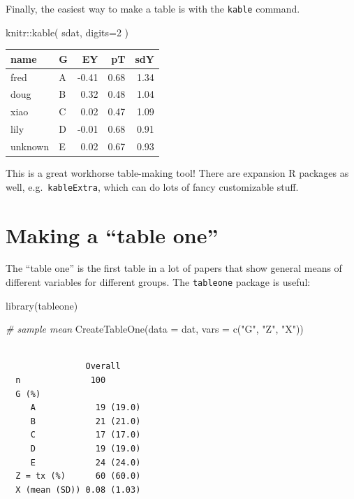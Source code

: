 \documentclass[
  letterpaper,
  DIV=11,
  numbers=noendperiod]{scrreprt}
\newenvironment{Shaded}{\begin{snugshade}}{\end{snugshade}}
\newcommand{\AttributeTok}[1]{\textcolor[rgb]{0.49,0.56,0.16}{#1}}
\newcommand{\CommentTok}[1]{\textcolor[rgb]{0.38,0.63,0.69}{\textit{#1}}}
\newcommand{\DecValTok}[1]{\textcolor[rgb]{0.25,0.63,0.44}{#1}}
\newcommand{\FunctionTok}[1]{\textcolor[rgb]{0.02,0.16,0.49}{#1}}
\newcommand{\NormalTok}[1]{\textcolor[rgb]{0.00,0.44,0.13}{#1}}
\newcommand{\SpecialCharTok}[1]{\textcolor[rgb]{0.25,0.44,0.63}{#1}}
\newcommand{\StringTok}[1]{\textcolor[rgb]{0.25,0.44,0.63}{#1}}
\begin{document}
Finally, the easiest way to make a table is with the \texttt{kable}
command.

\begin{Shaded}
\begin{Highlighting}[]
\NormalTok{knitr}\SpecialCharTok{::}\FunctionTok{kable}\NormalTok{( sdat, }\AttributeTok{digits=}\DecValTok{2}\NormalTok{ )}
\end{Highlighting}
\end{Shaded}

\begin{longtable}[]{@{}llrrr@{}}
\toprule\noalign{}
name & G & EY & pT & sdY \\
\midrule\noalign{}
\endhead
\bottomrule\noalign{}
\endlastfoot
fred & A & -0.41 & 0.68 & 1.34 \\
doug & B & 0.32 & 0.48 & 1.04 \\
xiao & C & 0.02 & 0.47 & 1.09 \\
lily & D & -0.01 & 0.68 & 0.91 \\
unknown & E & 0.02 & 0.67 & 0.93 \\
\end{longtable}

This is a great workhorse table-making tool! There are expansion R
packages as well, e.g.~\texttt{kableExtra}, which can do lots of fancy
customizable stuff.

\hypertarget{making-a-table-one}{%
\section{Making a ``table one''}\label{making-a-table-one}}

The ``table one'' is the first table in a lot of papers that show
general means of different variables for different groups. The
\texttt{tableone} package is useful:

\begin{Shaded}
\begin{Highlighting}[]
\FunctionTok{library}\NormalTok{(tableone)}

\CommentTok{\# sample mean  }
\FunctionTok{CreateTableOne}\NormalTok{(}\AttributeTok{data =}\NormalTok{ dat,}
               \AttributeTok{vars =} \FunctionTok{c}\NormalTok{(}\StringTok{"G"}\NormalTok{, }\StringTok{"Z"}\NormalTok{, }\StringTok{"X"}\NormalTok{))}
\end{Highlighting}
\end{Shaded}

\begin{verbatim}
               
                Overall     
  n              100        
  G (%)                     
     A            19 (19.0) 
     B            21 (21.0) 
     C            17 (17.0) 
     D            19 (19.0) 
     E            24 (24.0) 
  Z = tx (%)      60 (60.0) 
  X (mean (SD)) 0.08 (1.03) 
\end{verbatim}
\end{document}
